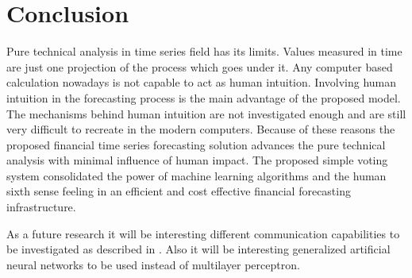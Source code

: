 \documentclass[runningheads]{llncs}
\begin{document}
\section{Conclusion} \label{Conclusion}

Pure technical analysis in time series field has its limits. Values measured in time are just one projection of the process which goes under it. Any computer based calculation nowadays is not capable to act as human intuition. Involving human intuition in the forecasting process is the main advantage of the proposed model. The mechanisms behind human intuition are not investigated enough and are still very difficult to recreate in the modern computers. Because of these reasons the proposed financial time series forecasting solution advances the pure technical analysis with minimal influence of human impact. The proposed simple voting system consolidated the power of machine learning algorithms and the human sixth sense feeling in an efficient and cost effective financial forecasting infrastructure.

As a future research it will be interesting different communication capabilities to be investigated as described in \cite{alexandrov01}. Also it will be interesting generalized artificial neural networks\cite{tashev01} to be used instead of multilayer perceptron.
\end{document}
